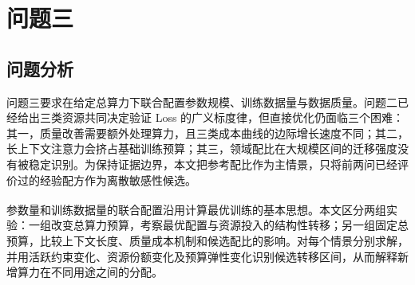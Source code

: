 \documentclass[bwprint]{gmcmthesis}
\numberwithin{equation}{section}
\numberwithin{figure}{section}
\numberwithin{table}{section}
\begin{document}




\section{问题三}

    \subsection{问题分析}

    问题三要求在给定总算力下联合配置参数规模、训练数据量与数据质量。问题二已经给出三类资源共同决定验证 Loss 的广义标度律，但直接优化仍面临三个困难：其一，质量改善需要额外处理算力，且三类成本曲线的边际增长速度不同；其二，长上下文注意力会挤占基础训练预算；其三，领域配比在大规模区间的迁移强度没有被稳定识别。为保持证据边界，本文把参考配比作为主情景，只将前两问已经评价过的经验配方作为离散敏感性候选。

    参数量和训练数据量的联合配置沿用计算最优训练的基本思想\textsuperscript{\cite{hoffmann2022chinchilla}}。本文区分两组实验：一组改变总算力预算，考察最优配置与资源投入的结构性转移；另一组固定总预算，比较上下文长度、质量成本机制和候选配比的影响。对每个情景分别求解，并用活跃约束变化、资源份额变化及预算弹性变化识别候选转移区间，从而解释新增算力在不同用途之间的分配。
\end{document}
